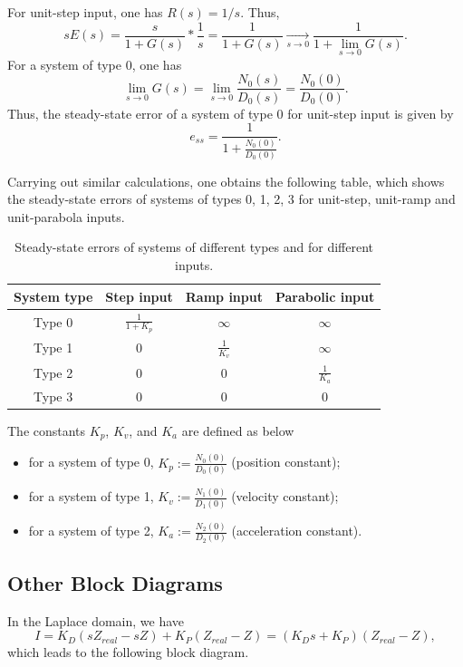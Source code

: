 \documentclass{scrreprt}
\theoremstyle{plain}
\theoremstyle{definition}
\theoremstyle{remark}
\begin{document}
For unit-step input, one has $R(s)=1/s$. Thus,
\[
sE(s) = \frac{s}{1+G(s)}*\frac{1}{s} = \frac{1}{1+G(s)}
\xrightarrow[s\to 0]{}\frac{1}{1+\lim_{s\to 0}G(s)}.
\]
For a system of type 0, one has
\[
\lim_{s\to 0}G(s) = \lim_{s\to 0}\frac{N_0(s)}{D_0(s)} = \frac{N_0(0)}{D_0(0)}.
\]
Thus, the steady-state error of a system of type 0 for unit-step input
is given by
\[
e_{ss} = \frac{1}{1+\frac{N_0(0)}{D_0(0)}}.
\]

Carrying out similar calculations, one obtains the following table,
which shows the steady-state errors of systems of types 0, 1, 2, 3 for
unit-step, unit-ramp and unit-parabola inputs.

\begin{table}[htp]
	\centering
	\begin{tabular}{|c|c|c|c|}
		\hline
		System type&Step input&Ramp input&Parabolic input\\\hline
		Type 0&$\frac{1}{1+K_p}$&$\infty$&$\infty$\\\hline
		Type 1&0&$\frac{1}{K_v}$&$\infty$\\\hline
		Type 2&0&0&$\frac{1}{K_a}$\\\hline
		Type 3&0&0&0 \\ \hline
	\end{tabular}
	\caption{Steady-state errors of systems of different types and for
		different inputs.}
	\label{tab:systype}
\end{table}

The constants $K_p$, $K_v$, and $K_a$ are defined as below
\begin{itemize}
	\item for a system of type 0, $K_p:=\frac{N_0(0)}{D_0(0)}$ (position constant);
	\item for a system of type 1, $K_v:=\frac{N_1(0)}{D_1(0)}$ (velocity constant);
	\item for a system of type 2, $K_a:=\frac{N_2(0)}{D_2(0)}$
	(acceleration constant).
\end{itemize}

\subsection{Other Block Diagrams}
In the Laplace domain, we have
\[
I = K_D(sZ_{real}-sZ) + K_P(Z_{real}-Z) = (K_Ds+K_P)(Z_{real}-Z),
\]
which leads to the following block diagram.
\end{document}
